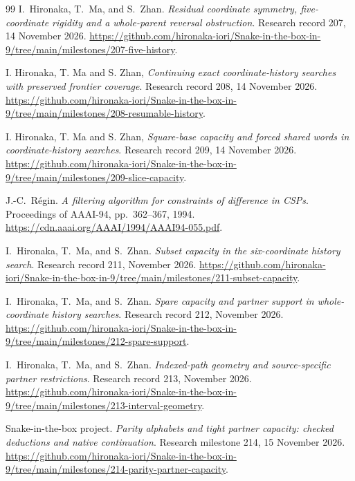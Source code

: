 \documentclass[11pt,a4paper]{article}
\theoremstyle{definition}
\theoremstyle{remark}
\begin{document}
\begin{thebibliography}{99}
I.~Hironaka, T.~Ma, and S.~Zhan. \emph{Residual coordinate symmetry,
five-coordinate rigidity and a whole-parent reversal obstruction}.
Research record 207, 14 November 2026.
\url{https://github.com/hironaka-iori/Snake-in-the-box-in-9/tree/main/milestones/207-five-history}.

I. Hironaka, T. Ma and S. Zhan, \emph{Continuing exact coordinate-history
searches with preserved frontier coverage}. Research record 208,
14 November 2026.
\url{https://github.com/hironaka-iori/Snake-in-the-box-in-9/tree/main/milestones/208-resumable-history}.

I. Hironaka, T. Ma and S. Zhan, \emph{Square-base capacity and forced
shared words in coordinate-history searches}. Research record 209,
14 November 2026.
\url{https://github.com/hironaka-iori/Snake-in-the-box-in-9/tree/main/milestones/209-slice-capacity}.

J.-C.~R\'egin. \emph{A filtering algorithm for constraints of difference
in CSPs}. Proceedings of AAAI-94, pp.~362--367, 1994.
\url{https://cdn.aaai.org/AAAI/1994/AAAI94-055.pdf}.

I.~Hironaka, T.~Ma, and S.~Zhan. \emph{Subset capacity in the
six-coordinate history search}. Research record 211, November 2026.
\url{https://github.com/hironaka-iori/Snake-in-the-box-in-9/tree/main/milestones/211-subset-capacity}.

I.~Hironaka, T.~Ma, and S.~Zhan. \emph{Spare capacity and partner support
in whole-coordinate history searches}. Research record 212, November 2026.
\url{https://github.com/hironaka-iori/Snake-in-the-box-in-9/tree/main/milestones/212-spare-support}.

I.~Hironaka, T.~Ma, and S.~Zhan. \emph{Indexed-path geometry and
source-specific partner restrictions}. Research record 213, November 2026.
\url{https://github.com/hironaka-iori/Snake-in-the-box-in-9/tree/main/milestones/213-interval-geometry}.


Snake-in-the-box project. \emph{Parity alphabets and tight partner
capacity: checked deductions and native continuation}. Research
milestone 214, 15 November 2026.
\url{https://github.com/hironaka-iori/Snake-in-the-box-in-9/tree/main/milestones/214-parity-partner-capacity}.

\end{thebibliography}
\end{document}
